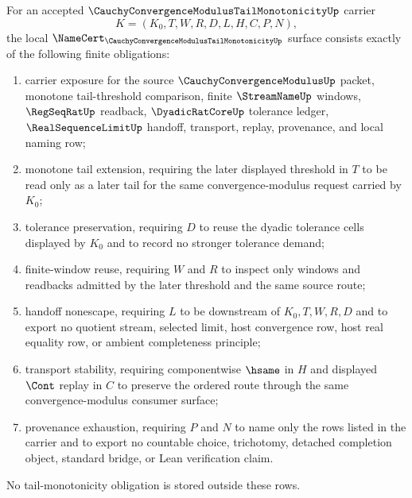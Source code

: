 \begin{theorem}
\label{thm:cauchy-convergence-modulus-tail-monotonicity-namecert-obligations}
For an accepted $\CauchyConvergenceModulusTailMonotonicityUp$ carrier
$$
K=(K_0,T,W,R,D,L,H,C,P,N),
$$
the local $\NameCert_{\CauchyConvergenceModulusTailMonotonicityUp}$ surface consists exactly of the following finite obligations:
\begin{enumerate}
\item carrier exposure for the source $\CauchyConvergenceModulusUp$ packet, monotone tail-threshold comparison, finite $\StreamNameUp$ windows, $\RegSeqRatUp$ readback, $\DyadicRatCoreUp$ tolerance ledger, $\RealSequenceLimitUp$ handoff, transport, replay, provenance, and local naming row;
\item monotone tail extension, requiring the later displayed threshold in $T$ to be read only as a later tail for the same convergence-modulus request carried by $K_0$;
\item tolerance preservation, requiring $D$ to reuse the dyadic tolerance cells displayed by $K_0$ and to record no stronger tolerance demand;
\item finite-window reuse, requiring $W$ and $R$ to inspect only windows and readbacks admitted by the later threshold and the same source route;
\item handoff nonescape, requiring $L$ to be downstream of $K_0,T,W,R,D$ and to export no quotient stream, selected limit, host convergence row, host real equality row, or ambient completeness principle;
\item transport stability, requiring componentwise $\hsame$ in $H$ and displayed $\Cont$ replay in $C$ to preserve the ordered route through the same convergence-modulus consumer surface;
\item provenance exhaustion, requiring $P$ and $N$ to name only the rows listed in the carrier and to export no countable choice, trichotomy, detached completion object, standard bridge, or Lean verification claim.
\end{enumerate}
No tail-monotonicity obligation is stored outside these rows.
\end{theorem}
